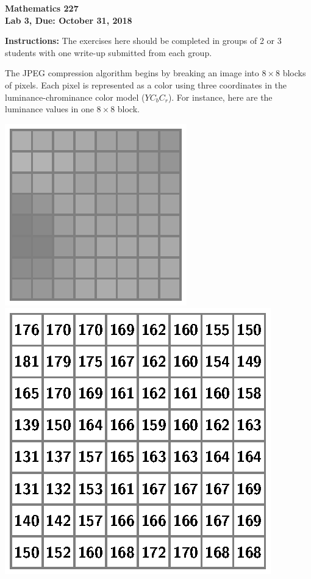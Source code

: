 \documentclass[12pt]{article}
\begin{document}
\noindent
{\bf Mathematics 227} \\ 
{\bf Lab 3, Due: October 31, 2018}

\bigskip

\noindent
{\bf Instructions:} The exercises here should be completed in groups
of 2 or 3 students with one write-up submitted from each group.

\medskip
The JPEG compression algorithm begins by breaking an image into
$8\times8$ blocks of pixels.  Each pixel is represented as a color
using three coordinates in the luminance-chrominance color model
($YC_bC_r$).  For instance, here are the luminance values in one
$8\times8$ block.

\begin{center}
  \includegraphics[scale=1.3]{jpeg-block-luminance.eps}
  \hspace*{24pt}
  \includegraphics[scale=0.9]{jpeg-block-luminance-values.eps}
\end{center}
\end{document}
